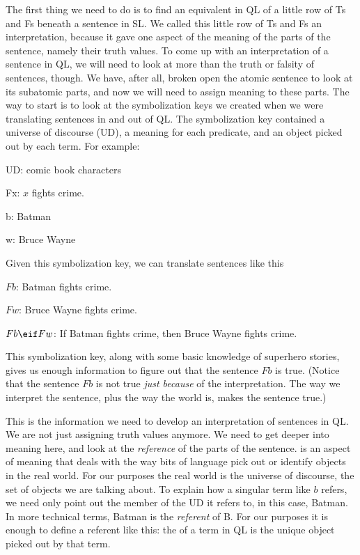 The first thing we need to do is to find an equivalent in QL of a little row of Ts and Fs beneath a sentence in SL. We called this little row of Ts and Fs an interpretation, because it gave one aspect of the meaning of the parts of the sentence, namely their truth values. To come up with an interpretation of a sentence in QL, we will need to look at more than the truth or falsity of sentences, though. We have, after all, broken open the atomic sentence to look at its subatomic parts, and now we will need to assign meaning to these parts. The way to start is to look at the symbolization keys we created when we were translating sentences in and out of QL. The symbolization key contained a universe of discourse (UD), a meaning for each predicate, and an object picked out by each term. For example:
\begin{ekey}
\item[UD:] comic book characters
\item[Fx:] $x$ fights crime.
\item[b:] Batman
\item[w:] Bruce Wayne
\end{ekey}

Given this symbolization key, we can translate sentences like this

\begin{earg}
\item[] $Fb$: Batman fights crime.
\item[] $Fw$: Bruce Wayne fights crime.
\item[] $Fb \eif Fw$: If Batman fights crime, then Bruce Wayne fights crime.  
\end{earg}
This symbolization key, along with some basic knowledge of superhero stories, gives us enough information to figure out that the sentence $Fb$ is true. (Notice that the sentence $Fb$ is not true \emph{just because} of the interpretation. The way we interpret the sentence, plus the way the world is, makes the sentence true.) 

This is the information we need to develop an interpretation of sentences in QL. We are not just assigning truth values anymore. We need to get deeper into meaning here, and look at the \emph{reference} of the parts of the sentence.  is an aspect of meaning that deals with the way bits of language pick out or identify objects in the real world. For our purposes the real world is the universe of discourse, the set of objects we are talking about. To explain how a singular term like $b$ refers, we need only point out the member of the UD it refers to, in this case, Batman. In more technical terms, Batman is the \emph{referent} of B. For our purposes it is enough to define a referent like this: the  of a term in QL is the unique object picked out by that term. 

